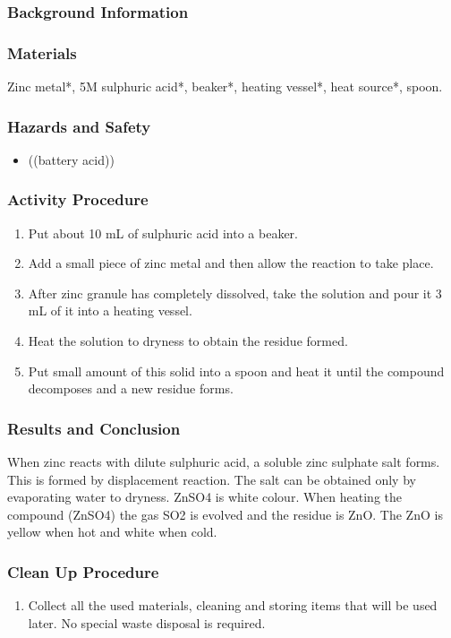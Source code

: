 \subsubsection*{Background Information}


\subsubsection*{Materials}
Zinc metal*, 5M sulphuric acid*, beaker*, heating vessel*, heat source*, spoon.

\subsubsection*{Hazards and Safety}
\begin{itemize}
\item{((battery acid))}
\end{itemize}

\subsubsection*{Activity Procedure}
\begin{enumerate}
\item{Put about 10 mL of sulphuric acid into a beaker.}
\item{Add a small piece of zinc metal and then allow the reaction to take place.}
\item{After zinc granule has completely dissolved, take the solution and pour it 3 mL of it into a heating vessel.}
\item{Heat the solution to dryness to obtain the residue formed.}
\item{Put small amount of this solid into a spoon and heat it until the compound decomposes and a new residue forms.}
\end{enumerate}

\subsubsection*{Results and Conclusion}
When zinc reacts with dilute sulphuric acid, a soluble zinc sulphate salt forms. This is formed by displacement reaction. The salt can be obtained only by evaporating water to dryness. ZnSO4 is white colour. When heating the compound (ZnSO4) the gas SO2 is evolved and the residue is ZnO. The ZnO is yellow when hot and white when cold.

\subsubsection*{Clean Up Procedure}
\begin{enumerate}
\item{Collect all the used materials, cleaning and storing items that will be used later. No special waste disposal is required.}
\end{enumerate}

